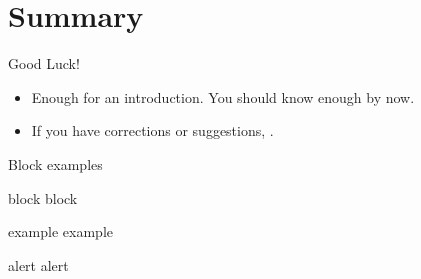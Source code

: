 \section{Summary}

\begin{frame}{Good Luck!}
\begin{itemize}
\item Enough for an introduction. You should know enough by now.
\item If you have corrections or suggestions, .
\end{itemize}
\end{frame}

\begin{frame}{Block examples}
\begin{block}{block}
block
\end{block}
\begin{exampleblock}{example}
example
\end{exampleblock}
\begin{alertblock}{alert}
alert
\end{alertblock}
\end{frame}

